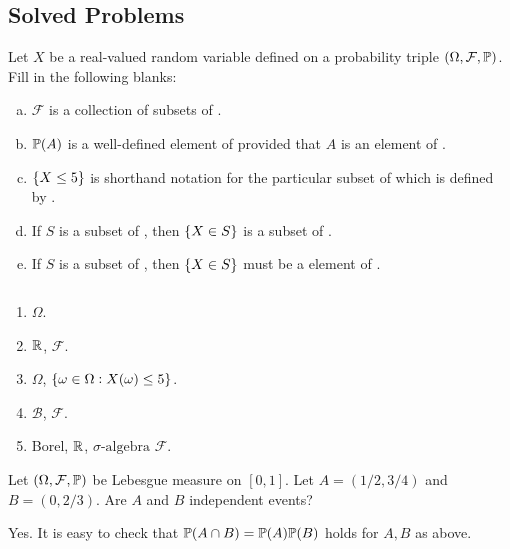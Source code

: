 \subsection{Solved Problems}
\begin{problem}
	Let $ X $ be a real-valued random variable defined on a probability triple $ (\Omega, \mathcal{F},\mathbb{P}) $. Fill in the following blanks:
	\begin{enumerate}[(a)]
		\item $ \mathcal{F} $ is a collection of subsets of \blank.
		\item $ \mathbb{P}(A) $ is a well-defined element of \blank provided that $ A $ is an element of \blank.
		\item $ \{X\leq 5\} $ is shorthand notation for the particular subset of \blank which is defined by \blank.
		\item If $ S $ is a subset of \blank, then $ \{X\in S\} $ is a subset of \blank.
		\item If $ S $ is a \blank subset of \blank, then $ \{X \in S\} $ must be a element of \blank.
	\end{enumerate}
\end{problem}
\begin{solution}
	$ \quad $
	\begin{enumerate}[noitemsep]
		\item $ \Omega $.
		\item $ \mathbb{R} $, $ \mathcal{F} $.
		\item $ \Omega $, $ \{\omega\in \Omega: X(\omega)\leq 5\} $.
		\item $ \mathcal{B} $, $ \mathcal{F} $.
		\item Borel, $ \mathbb{R} $, $\sigma\text{-algebra}$ $ \mathcal{F} $.
	\end{enumerate}
\end{solution}

\begin{problem}
	Let $ (\Omega, \mathcal{F},\mathbb{P}) $ be Lebesgue measure on $ [0,1] $. Let $ A = (1/2,3/4) $ and $ B = (0,2/3) $. Are $ A $ and $ B $ independent events?
\end{problem}
\begin{solution}
	Yes. It is easy to check that  $ \mathbb{P}(A \cap B) = \mathbb{P}(A) \mathbb{P}(B) $ holds for $ A,B $ as above.
\end{solution}



